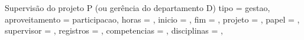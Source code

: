 \begin{atividade}{Supervisão do projeto P (ou gerência do departamento D)}{
  tipo         = gestao,
  aproveitamento = participacao,   %
  horas        = {},   %
  inicio       = {},   %
  fim          = {},   %
  projeto      = {},
  papel        = {},   %
  supervisor   = {},   %
  registros    = {},   %
  competencias = {},   %
  disciplinas  = {},   %
}

\begin{contexto}
\end{contexto}

\begin{contribuicao}
\end{contribuicao}

\begin{desenvolvimento}


\end{desenvolvimento}
\end{atividade}
